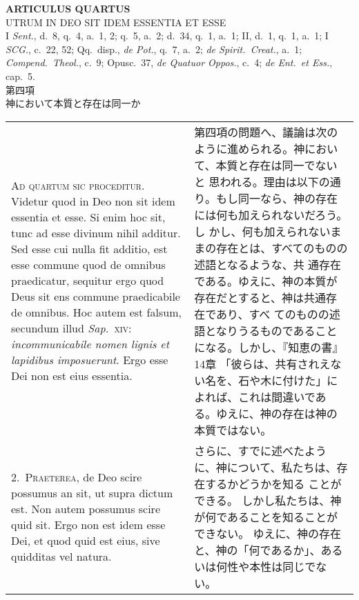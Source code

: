 \documentclass[10pt]{jsarticle} %
\begin{document}
\newpage
{}

\begin{center}
 {\Large {\bf ARTICULUS QUARTUS}}\\
 {\large UTRUM IN DEO SIT IDEM ESSENTIA ET ESSE}\\
 {\footnotesize I \textit{Sent.}, d.~8, q.~4, a.~1, 2; q.~5, a.~2;
 d.~34, q.~1, a.~1; II, d.~1, q.~1, a.~1; I \textit{SCG.}, c.~22, 52;
 Qq.~disp., \textit{de Pot.}, q.~7, a.~2; \textit{de Spirit.~Creat.},
 a.~1; \textit{Compend.~Theol.}, c.~9; Opusc.~37, \textit{de Quatuor
 Oppos.}, c.~4; \textit{de Ent.~et Ess.}, cap.~5.}\\
{\Large 第四項\\神において本質と存在は同一か}
\end{center}

\begin{longtable}{p{21em}p{21em}}

{\huge A}\textsc{d quartum sic proceditur}. Videtur quod in Deo non sit
 idem essentia et esse.  Si enim hoc sit, tunc ad esse divinum nihil
 additur.  Sed esse cui nulla fit additio, est esse commune quod de
 omnibus praedicatur, sequitur ergo quod Deus sit ens commune
 praedicabile de omnibus.  Hoc autem est falsum, secundum illud
 \textit{Sap.}~\textsc{xiv}: \textit{incommunicabile nomen lignis et
 lapidibus imposuerunt}.  Ergo esse Dei non est eius essentia.

&


第四項の問題へ、議論は次のように進められる。神において、本質と存在は同一でないと
 思われる。理由は以下の通り。もし同一なら、神の存在には何も加えられないだろう。し
 かし、何も加えられないままの存在とは、すべてのものの述語となるような、共
 通存在である。ゆえに、神の本質が存在だとすると、神は共通存在であり、すべ
 てのものの述語となりうるものであることになる。しかし、『知恵の書』14章
 「彼らは、共有されえない名を、石や木に付けた」によれば、これは間違いであ
 る。ゆえに、神の存在は神の本質ではない。

\\


2.~\textsc{Praeterea}, de Deo scire possumus an sit, ut supra dictum est.
Non autem possumus scire quid sit.
Ergo non est idem esse Dei, et quod quid est eius, sive quidditas vel
 natura.

&

さらに、すでに述べたように、神について、私たちは、存在するかどうかを知る
 ことができる。
しかし私たちは、神が何であることを知ることができない。
ゆえに、神の存在と、神の「何であるか」、あるいは何性や本性は同じでない。


\end{longtable}
\end{document}
